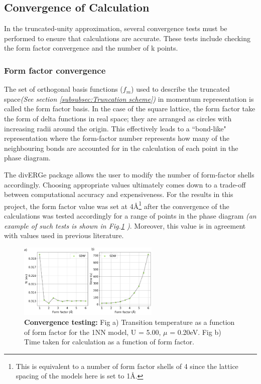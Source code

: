 \documentclass[12pt]{article}
\begin{document}
 

\subsection{Convergence of Calculation}
\label{subsec:convergence}
In the truncated-unity approximation, several convergence tests must be performed to ensure that calculations are accurate.
These tests include checking the form factor convergence and the number of k points.

\subsubsection{Form factor convergence}

The set of orthogonal basis functions ($f_m$) used to describe the truncated space\textit{(See section \ref{subsubsec:Truncation scheme})}
in momentum representation is called the form factor basis\cite{lichtenstein2018functional}. In the case of the square lattice, 
the form factor take the form of delta functions in real space; they are arranged as circles with increasing radii around the origin. This effectively leads to a ``bond-like" representation where the form-factor number
represents how many of the neighbouring bonds are accounted for in the calculation of each point in the phase diagram.\par

\medskip


\noindent The divERGe package allows the user to modify the number of form-factor shells accordingly. Choosing appropriate values ultimately comes down to a trade-off 
between computational accuracy and expensiveness. 
For the results in this project, the form factor value was set at 4\AA\footnote{This is equivalent to a number of form factor shells of 4 since the lattice spacing of the models here is set to 1\AA.} after the convergence of  
the calculations was tested accordingly for a range of points in the phase diagram \textit{(an example of such tests is shown in Fig.\ref{fig:Formfactorconvergence} )}. Moreover, this value is in agreement with values used in previous literature\cite{lichtenstein2018functional}. 

\begin{figure}[htbp]  %
    \centering
    \includegraphics[width=0.6\textwidth]{convergence.png}  %
    \caption{\textbf{Convergence testing:} Fig a) Transition temperature as a function of form factor for the 1NN model, U = 5.00, $\mu$ = 0.20eV. Fig b) Time taken for calculation
    as a function of form factor.   }
    \label{fig:Formfactorconvergence}
\end{figure}
\end{document}
